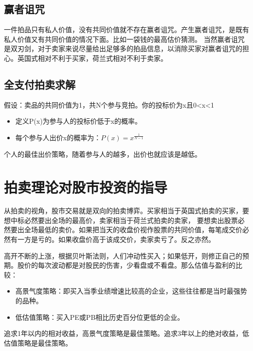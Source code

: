\documentclass[12pt, a4paper]{article} %
\begin{document}
\begin{CJK*}{UTF8}{gbsn}
        \subsection{赢者诅咒}
        一件拍品只有私人价值，没有共同价值就不存在赢者诅咒。产生赢者诅咒，是既有私人价值又有共同价值的情况下面。比如一袋钱的最高估价猜测。
        当然赢者诅咒是双刃剑，对于卖家来说尽量给出足够多的拍品信息，以消除买家对赢者诅咒的担心。英国式相对不利于买家，荷兰式相对不利于卖家。

        \subsection{全支付拍卖求解}
        假设：卖品的共同价值为1，共N个参与竞拍。你的投标价为x且0<x<1
        \begin{itemize}
            \item[] 定义P(x)为参与人的投标价低于x的概率。
            \item[] 每个参与人出价x的概率为：$P(x) = x^{\frac{1}{N-1}}$
        \end{itemize}
        个人的最佳出价策略，随着参与人的越多，出价也就应该是越低。

        \clearpage
        \section{拍卖理论对股市投资的指导}
        从拍卖的视角，股市交易就是双向的拍卖博弈。买家相当于英国式拍卖的买家，要想中标必然要出全场的最高价，卖家相当于荷兰式拍卖的卖家，
        要想卖出股票必然要出全场最低的卖价。如果把当天的收盘价视作股票的共同价值，每笔成交价必然有一方是亏的。如果收盘价高于该成交价，卖家卖亏了。反之亦然。\par

        高开不断的上涨，根据贝叶斯法则，人们冲动性买入；如果低开，则修正自己的预期。股价的每次波动都是对股民的伤害，少看盘或不看盘。那么估值与盈利的比较：
        \begin{itemize}
            \item[] 高景气度策略：即买入当季业绩增速比较高的企业，这些往往都是当时最强势的品种。
            \item[] 低估值策略：买入PE或PB相比历史百分位更低的企业。
        \end{itemize}
        追求1年以内的相对收益，高景气度策略是最佳策略。追求3年以上的绝对收益，低估值策略是最佳策略。


    \end{CJK*}
\end{document}
